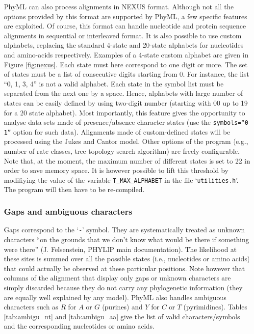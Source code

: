 \documentclass[a4paper,12pt]{article}
\newcommand{\x}[1]{\texttt{#1}}
\begin{document}
PhyML can  also process alignments in  NEXUS format. Although not  all the options provided  by this
format are supported  by PhyML, a few specific  features are exploited.  Of course,  this format can
handle nucleotide and protein  sequence alignments in sequential or interleaved  format.  It is also
possible  to  use custom  alphabets,  replacing  the standard  4-state  and  20-state alphabets  for
nucleotides and amino-acids respectively. Examples of a  4-state custom alphabet are given in Figure
\ref{fig:nexus}. Each state must here  correspond to one digit or more. The set  of states must be a
list of consecutive  digits starting from 0.  For instance,  the list ``0, 1, 3, 4''  is not a valid
alphabet. Each  state in the  symbol list must  be separated  from the next  one by a  space. Hence,
alphabets with large number of states can be easily defined by using two-digit number (starting with
00 up  to 19  for a 20  state alphabet).  Most  importantly, this  feature gives the  opportunity to
analyse data sets made of presence/absence character states (use the \texttt{symbols=``0 1''} option
for such data). Alignments made  of custom-defined states will be processed
using the Jukes and Cantor model.  Other options  of the program (e.g., number of rate classes, tree
topology search algorithm) are freely configurable. Note  that, at the moment, the maximum number of
different states is  set to 22 in order to  save memory space.  It is however  possible to lift this
threshold   by  modifiying   the   value  of   the  variable   \x{T\_MAX\_ALPHABET}   in  the   file
`\x{utilities.h}'. The program will then have to be re-compiled.



\subsubsection{Gaps and ambiguous characters}

Gaps correspond to  the `\x{-}' symbol.  They are systematically treated  as unknown characters ``on
the grounds  that we  don't know what  would be  there if something  were there''  (J.  Felsenstein,
PHYLIP main documentation).   The likelihood at these  sites is summed over all  the possible states
(i.e.,  nucleotides  or   amino  acids)  that  could  actually  be   observed  at  these  particular
positions. Note however that  columns of the alignment that display only  gaps or unknown characters
are simply discarded because  they do not carry any phylogenetic information  (they are equally well
explained  by any  model).  PhyML  also handles  ambiguous characters  such as  $R$ for  $A$  or $G$
(purines) and $Y$ for $C$  or $T$ (pyrimidines).  Tables \ref{tab:ambigu_nt} and \ref{tab:ambigu_aa}
give the list of valid characters/symbols and the corresponding nucleotides or amino acids.
\end{document}
